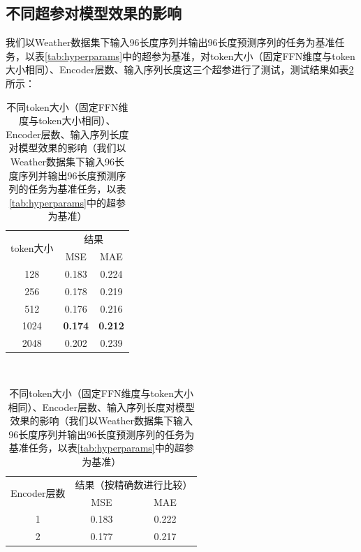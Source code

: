 \documentclass[twoside,12pt]{article}
\begin{document}
\subsection{不同超参对模型效果的影响}
我们以Weather数据集下输入96长度序列并输出96长度预测序列的任务为基准任务，以表\ref{tab:hyperparams}中的超参为基准，对token大小（固定FFN维度与token大小相同）、Encoder层数、输入序列长度这三个超参进行了测试，测试结果如表\ref{tab:hyperparams_test}所示：
\begin{table}[htbp]
  \caption{不同token大小（固定FFN维度与token大小相同）、Encoder层数、输入序列长度对模型效果的影响（我们以Weather数据集下输入96长度序列并输出96长度预测序列的任务为基准任务，以表\ref{tab:hyperparams}中的超参为基准）}
  \label{tab:hyperparams_test}
  \vspace{5pt}
  \centering
  \begin{tabular}{c|cc}
    \toprule
    \multirow{2}{*}{token大小} & \multicolumn{2}{c}{结果}                  \\
    \cmidrule(lr){2-3}
                               & MSE                      & MAE            \\
    \midrule
    128                        & 0.183                    & 0.224          \\
    256                        & 0.178                    & 0.219          \\
    512                        & 0.176                    & 0.216          \\
    1024                       & \textbf{0.174}           & \textbf{0.212} \\
    2048                       & 0.202                    & 0.239          \\
    \bottomrule
  \end{tabular}
  \\
  \vspace{5pt}
  \centering
  \begin{tabular}{c|cc}
    \toprule
    \multirow{2}{*}{Encoder层数} & \multicolumn{2}{c}{结果（按精确数进行比较）}                  \\
    \cmidrule(lr){2-3}
                                 & MSE                                          & MAE            \\
    \midrule
    1                            & 0.183                                        & 0.222          \\
    2                            & 0.177                                        & 0.217          \\

\end{tabular}
\end{table}
\end{document}
